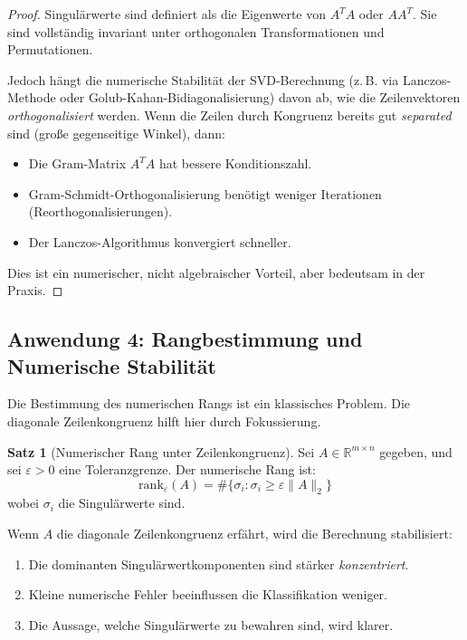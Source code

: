 \documentclass[a4paper,12pt]{article}
\theoremstyle{definition}
\newtheorem{satz}{Satz}
\begin{document}
\begin{proof}
	Singulärwerte sind definiert als die Eigenwerte von $A^T A$ oder $A A^T$. Sie sind vollständig invariant unter orthogonalen Transformationen und Permutationen.
	
	Jedoch hängt die numerische Stabilität der SVD-Berechnung (z.\,B. via Lanczos-Methode oder Golub-Kahan-Bidiagonalisierung) davon ab, wie die Zeilenvektoren \emph{orthogonalisiert} werden. Wenn die Zeilen durch Kongruenz bereits gut \emph{separated} sind (große gegenseitige Winkel), dann:
	\begin{itemize}
		\item Die Gram-Matrix $A^T A$ hat bessere Konditionszahl.
		\item Gram-Schmidt-Orthogonalisierung benötigt weniger Iterationen (Reorthogonalisierungen).
		\item Der Lanczos-Algorithmus konvergiert schneller.
	\end{itemize}
	
	Dies ist ein numerischer, nicht algebraischer Vorteil, aber bedeutsam in der Praxis.
\end{proof}

\subsection{Anwendung 4: Rangbestimmung und Numerische Stabilität}

Die Bestimmung des numerischen Rangs ist ein klassisches Problem. Die diagonale Zeilenkongruenz hilft hier durch Fokussierung.

\begin{satz}[Numerischer Rang unter Zeilenkongruenz]
	\label{satz:numerischer-rang}
	Sei $A \in \mathbb{R}^{m \times n}$ gegeben, und sei $\varepsilon > 0$ eine Toleranzgrenze. Der numerische Rang ist:
	\[
	\text{rank}_\varepsilon(A) = \#\{\sigma_i : \sigma_i \geq \varepsilon \|A\|_2\}
	\]
	wobei $\sigma_i$ die Singulärwerte sind.
	
	Wenn $A$ die diagonale Zeilenkongruenz erfährt, wird die Berechnung stabilisiert:
	\begin{enumerate}
		\item Die dominanten Singulärwertkomponenten sind stärker \emph{konzentriert}.
		\item Kleine numerische Fehler beeinflussen die Klassifikation weniger.
		\item Die Aussage, welche Singulärwerte zu bewahren sind, wird klarer.
	\end{enumerate}
\end{satz}
\end{document}
